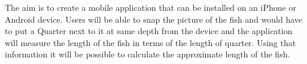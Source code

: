 The aim is to create a mobile application that can be installed on an iPhone or Android device. Users will be able to snap the picture of the fish and would have to put a Quarter next to it at same depth from the device and the application will measure the length of the fish in terms of the length of quarter. Using that information it will be possible to calculate the approximate length of the fish.